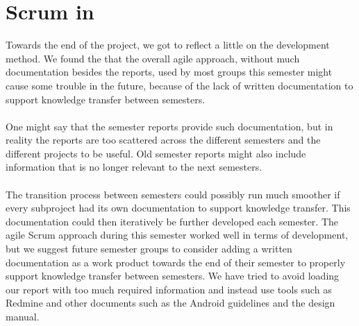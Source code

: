 
\section{Scrum in \giraf}

Towards the end of the project, we got to reflect a little on the \giraf development method. We found the that the overall agile approach, without much documentation besides the reports, used by most groups this semester might cause some trouble in the future, because of the lack of written documentation to support knowledge transfer between semesters.
\\\\
One might say that the semester reports provide such documentation, but in reality the reports are too scattered across the different semesters and the different projects to be useful. Old semester reports might also include information that is no longer relevant to the next semesters. 
\\\\
The transition process between semesters could possibly run much smoother if every subproject had its own documentation to support knowledge transfer. This documentation could then iteratively be further developed each semester. The agile Scrum approach during this semester worked well in terms of development, but we suggest future semester groups to consider adding a written documentation as a work product towards the end of their semester to properly support knowledge transfer between semesters. We have tried to avoid loading our report with too much required information and instead use tools such as Redmine and other documents such as the Android guidelines and the design manual.

